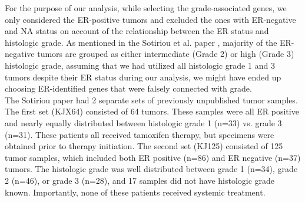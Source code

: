 \documentclass[a4paper,10pt]{article}
\begin{document}
For the purpose of our analysis, while selecting the grade-associated genes, 
we only considered the ER-positive tumors and excluded the ones with ER-negative
 and NA status on account of the relationship between the ER status and histologic 
grade. As mentioned in the Sotiriou et al. paper \cite{Sotiriou}, majority of the ER-negative tumors
 are grouped as either intermediate (Grade 2) or high (Grade 3) histologic grade, 
assuming that we had utilized all histologic grade 1 and 3 tumors despite their ER 
status during our analysis, we might have ended up choosing ER-identified genes
 that were falsely connected with grade.\\

The Sotiriou paper had 2 separate sets of previously unpublished tumor samples. 
The first set (KJX64) consisted of 64 tumors. These samples were all ER positive 
and nearly equally distributed between histologic grade 1 (n=33) vs. grade 3 (n=31). 
These patients all received tamoxifen therapy, but specimens were obtained prior to 
therapy initiation. The second set (KJ125) consisted of 125 tumor samples, which 
included both ER positive (n=86) and ER negative (n=37) tumors. The histologic 
grade was well distributed between grade 1 (n=34), grade 2 (n=46), or grade 3 (n=28), 
and 17 samples did not have histologic grade known. Importantly, none of these patients
 received systemic treatment.
\end{document}
